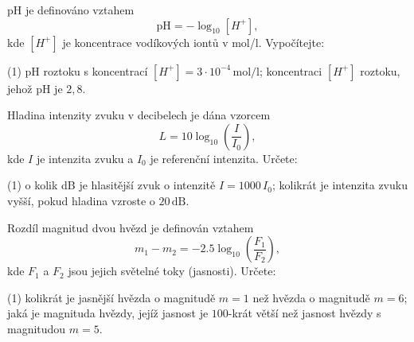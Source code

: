 \documentclass[12pt,a4paper]{article}
\begin{document}
\begin{exercise}
    pH je definováno vztahem
    \[
    \mathrm{pH} = -\log_{10}[H^+],
    \]
    kde \([H^+]\) je koncentrace vodíkových iontů v mol/l.
    Vypočítejte:
    \begin{tasks}(1)
        \task pH roztoku s koncentrací \([H^+] = 3 \cdot 10^{-4}\,\text{mol/l}\);
        \task koncentraci \([H^+]\) roztoku, jehož pH je \(2{,}8\).
    \end{tasks}
\end{exercise}


\begin{exercise}
    Hladina intenzity zvuku v decibelech je dána vzorcem
    \[
    L = 10 \log_{10}\!\left(\frac{I}{I_0}\right),
    \]
    kde \(I\) je intenzita zvuku a \(I_0\) je referenční intenzita.
    Určete:
    \begin{tasks}(1)
        \task o kolik dB je hlasitější zvuk o intenzitě \(I = 1000\, I_0\);
        \task kolikrát je intenzita zvuku vyšší, pokud hladina vzroste o \(20\,\mathrm{dB}\).
    \end{tasks}
\end{exercise}


\begin{exercise}
    Rozdíl magnitud dvou hvězd je definován vztahem
    \[
    m_1 - m_2 = -2.5 \log_{10}\!\left(\frac{F_1}{F_2}\right),
    \]
    kde \(F_1\) a \(F_2\) jsou jejich světelné toky (jasnosti).
    Určete:
    \begin{tasks}(1)
        \task kolikrát je jasnější hvězda o magnitudě \(m = 1\) než hvězda o magnitudě \(m = 6\);
        \task jaká je magnituda hvězdy, jejíž jasnost je \(100\)-krát větší než jasnost hvězdy s magnitudou \(m = 5\).
    \end{tasks}
\end{exercise}
\end{document}
